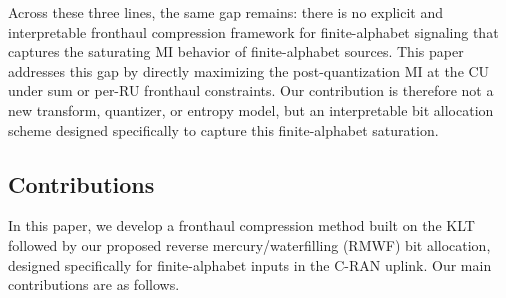\documentclass[10pt, twocolumn, comsoc]{IEEEtran}
\begin{document}
Across these three lines, the same gap remains: there is no explicit and interpretable fronthaul compression framework for finite-alphabet signaling that captures the saturating MI behavior of finite-alphabet sources.
This paper addresses this gap by directly maximizing the post-quantization MI at the CU under sum or per-RU fronthaul constraints.
Our contribution is therefore not a new transform, quantizer, or entropy model, but an interpretable bit allocation scheme designed specifically to capture this finite-alphabet saturation.



\subsection{Contributions}
\label{sec:contributions}



In this paper, we develop a fronthaul compression method built on the KLT followed by our proposed reverse mercury/waterfilling (RMWF) bit allocation, designed specifically for finite-alphabet inputs in the C-RAN uplink. Our main contributions are as follows.
\end{document}
